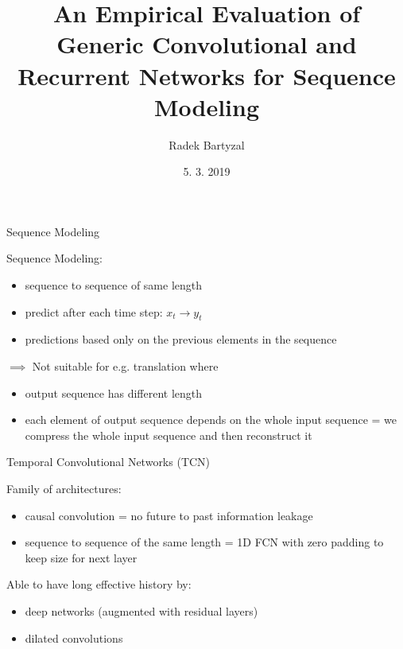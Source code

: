 \documentclass{beamer}
\begin{document}
\title{An Empirical Evaluation of Generic Convolutional and Recurrent Networks for Sequence Modeling}  
\author{Radek Bartyzal}
\date{5. 3. 2019} 

\frame{\titlepage} 

\begin{frame}{Sequence Modeling}

Sequence Modeling:
\begin{itemize}
\item  sequence to sequence of same length
\item predict after each time step: $x_t \rightarrow y_t$
\item predictions based only on the previous elements in the sequence
\end{itemize}

\vfill

$\implies$ Not suitable for e.g. translation where 
\begin{itemize}
\item output sequence has different length
\item each element of output sequence depends on the whole input sequence = we compress the whole input sequence and then reconstruct it 
\end{itemize}

\end{frame}

\begin{frame}{Temporal Convolutional Networks (TCN)}

Family of architectures:
\begin{itemize}
\item causal convolution = no future to past information leakage
\item sequence to sequence of the same length = 1D FCN with zero padding to keep size for next layer
\end{itemize}

\vfill

Able to have long effective history by:
\begin{itemize}
\item deep networks (augmented with residual layers) 
\item dilated convolutions
\end{itemize}


\end{frame}
\end{document}
